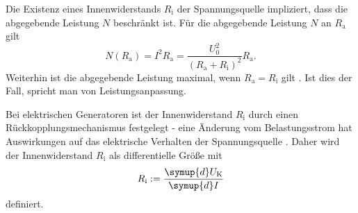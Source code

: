 Die Existenz eines Innenwiderstands $R_{\text{i}}$ der Spannungsquelle impliziert, dass die abgegebende Leistung $N$ beschränkt ist.
Für die abgegebende Leistung $N$ an $R_{\text{a}}$ gilt \cite{demi}
\begin{equation}
	N(R_{\text{a}}) = I^2 R_{\text{a}} = \frac{U_0^2}{(R_{\text{a}} + R_{\text{i}})^2} R_{\text{a}} \text{.}
	\label{eqn:leistung}
\end{equation}
Weiterhin ist die abgegebende Leistung maximal, wenn $R_{\text{a}} = R_{\text{i}}$ gilt \cite{demi}.
Ist dies der Fall, spricht man von Leistungsanpassung.

Bei elektrischen Generatoren ist der Innenwiderstand $R_{\text{i}}$ durch einen Rückkopplungsmechanismus festgelegt - eine Änderung vom Belastungsstrom hat Auswirkungen auf das elektrische Verhalten der Spannungsquelle \cite{Anleitung}. Daher wird der Innenwiderstand $R_{\text{i}}$ als differentielle Größe mit
\begin{equation}
	R_{\text{i}} := \frac{\symup{d}U_{\text{K}}}{\symup{d}I}
\end{equation}
definiert.

